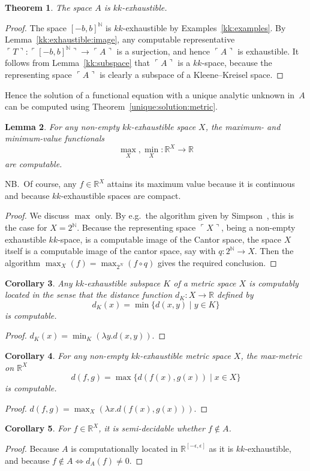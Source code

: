 \documentclass[10pt]{article}
\newcommand{\godel}[1]{\ulcorner #1 \urcorner}
\newtheorem{cor}{Corollary}[section]
\newtheorem{lemma}[cor]{Lemma}
\newtheorem{theorem}[cor]{Theorem}
\newcommand{\N}{\mathbb{N}}
\newcommand{\R}{\mathbb{R}}
\newcommand{\comp}{\circ}
\begin{document}
\begin{theorem}
  The space $A$ is $kk$-exhaustible.
\end{theorem}
\begin{proof}
  The space $[-b,b]^\N$ is $kk$-exhaustible by
  Examples~\ref{kk:examples}.  By Lemma~\ref{kk:exhaustible:image},
  any computable representative $\godel{T} \colon \godel{[-b,b]^\N}
  \to \godel{A}$ is a surjection, and hence
  $\godel{A}$ is exhaustible. It follows from
  Lemma~\ref{kk:subspace} that $\godel{A}$ is a
  $kk$-space, because the representing space $\godel{A}$
  is clearly a subspace of a Kleene--Kreisel space.
\end{proof}

Hence the solution of a functional equation with a unique analytic
unknown in~$A$ can be computed using
Theorem~\ref{unique:solution:metric}.

\begin{lemma}
  For any non-empty $kk$-exhaustible space $X$, the maximum- and
  minimum-value functionals
  \[
  {\max}_X, {\min}_X \colon \R^X \to \R
  \]
  are computable.
\end{lemma}
\noindent
NB.\ Of course, any $f \in \R^X$ attains its maximum value because it
is continuous and because $kk$-exhaustible spaces are compact.
\begin{proof}
  We discuss $\max$ only. By e.g.\ the algorithm given by
  Simpson~\cite{simpson:integration}, this is the case for $X=2^\N$.
  Because the representing space $\godel{X}$, being a non-empty
  exhaustible $kk$-space, is a computable image of the Cantor space,
  the space $X$ itself is a computable image of the cantor space, say
  with $q \colon 2^\N \to X$. Then the algorithm $\max_X(f)=\max_{2^N}(f
  \comp q)$ gives the required conclusion.
\end{proof}

\begin{cor}
  Any $kk$-exhaustible subspace $K$ of a metric space $X$ is
  computably located in the sense that the distance function $d_K
  \colon X \to \R$ defined by
  \[ d_K(x) = \min \{ d(x,y) \mid y \in K \} \]
  is computable.
\end{cor}
\begin{proof}
  $d_K(x)=\min_K(\lambda y.d(x,y))$.
\end{proof}

\begin{cor}
  For any non-empty $kk$-exhaustible metric space $X$, the max-metric
  on $\R^X$
  \[
  d(f,g) = \max \{ d(f(x),g(x)) \mid x \in X \}
  \]
  is computable.
\end{cor}
\noindent
\begin{proof}
  $d(f,g)=\max_X(\lambda x.d(f(x),g(x)))$.
\end{proof}
\begin{cor}
  For $f \in \R^X$, it is semi-decidable whether $f \not\in A$. 
\end{cor}
\begin{proof}
  Because $A$ is computationally located in
  $\R^{[-\epsilon,\epsilon]}$ as it is
  $kk$-exhaustible, and because $f \not\in A \iff d_A(f) \ne 0$.
\end{proof}
\end{document}
